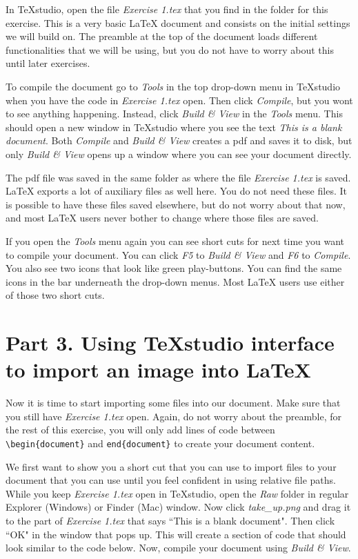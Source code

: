 \documentclass[12pts]{report}
\begin{document}
In TeXstudio, open the file \emph{Exercise 1.tex} that you find in the folder for this exercise. This is a very basic {\LaTeX} document and consists on the initial settings we will build on. The preamble at the top of the document loads different functionalities that we will be using, but you do not have to worry about this until later exercises.

To compile the document go to \emph{Tools} in the top drop-down menu in TeXstudio when you have the code in \emph{Exercise 1.tex} open. Then click \emph{Compile}, but you wont to see anything happening. Instead, click \emph{Build \& View} in the \emph{Tools} menu. This should open a new window in TeXstudio where you see the text \emph{This is a blank document}. Both \emph{Compile} and \emph{Build \& View} creates a pdf and saves it to disk, but only \emph{Build \& View} opens up a window where you can see your document directly. 

The pdf file was saved in the same folder as where the file \emph{Exercise 1.tex} is saved. {\LaTeX} exports a lot of auxiliary files as well here. You do not need these files. It is possible to have these files saved elsewhere, but do not worry about that now, and most {\LaTeX} users never bother to change where those files are saved.

If you open the \emph{Tools} menu again you can see short cuts for next time you want to compile your document. You can click \emph{F5} to \emph{Build \& View} and \emph{F6} to \emph{Compile}. You also see two icons that look like green play-buttons. You can find the same icons in the bar underneath the drop-down menus. Most {\LaTeX} users use either of those two short cuts.

\section*{Part 3. Using TeXstudio interface to import an image into \LaTeX}
Now it is time to start importing some files into our document. Make sure that you still have \emph{Exercise 1.tex} open. Again, do not worry about the preamble, for the rest of this exercise, you will only add lines of code between \verb|\begin{document}| and \verb|end{document}| to create your document content.

We first want to show you a short cut that you can use to import files to your document that you can use until you feel confident in using relative file paths. While you keep \emph{Exercise 1.tex} open in TeXstudio, open the \emph{Raw} folder in regular Explorer (Windows) or Finder (Mac) window. Now click \emph{take\_up.png} and drag it to the part of \emph{Exercise 1.tex} that says ``This is a blank document". Then click ``OK" in the window that pops up. This will create a section of code that should look similar to the code below. Now, compile your document using \emph{Build \& View}.
\end{document}
